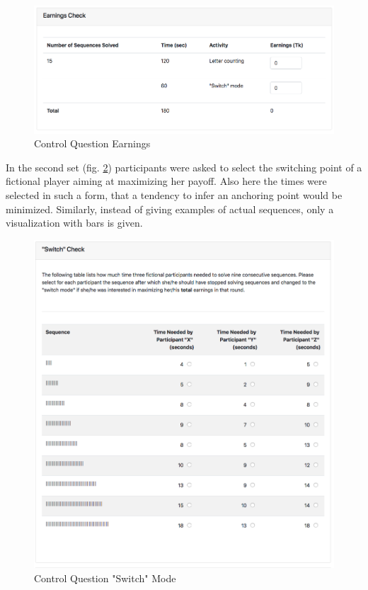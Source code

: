     \begin{figure}
        \centering
        \includegraphics[width=\textwidth]{graphs/cq_earnings.png}
        \caption{Control Question Earnings}
        \label{fig:cq_earnings}
    \end{figure}
    
    In the second set (fig. \ref{fig:cq_switch}) participants were asked to select the switching point of a fictional player aiming at maximizing her payoff. Also here the times were selected in such a form, that a tendency to infer an anchoring point would be minimized. Similarly, instead of giving examples of actual sequences, only a visualization with bars is given.
    
    \begin{figure}
        \centering
        \includegraphics[width=\textwidth]{graphs/cq_switch.png}
        \caption{Control Question "Switch" Mode}
        \label{fig:cq_switch}
    \end{figure}
    
